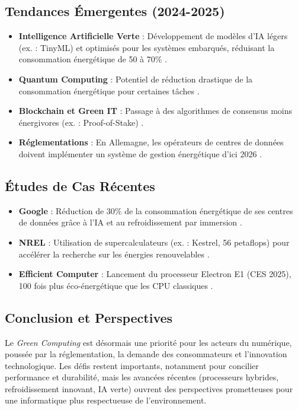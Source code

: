 \documentclass[10pt,a4paper]{article}
\begin{document}
\subsection{Tendances Émergentes (2024-2025)}
\begin{itemize}
    \item \textbf{Intelligence Artificielle Verte} : Développement de modèles d'IA légers (ex. : TinyML) et optimisés pour les systèmes embarqués, réduisant la consommation énergétique de 50 à 70\% \cite{semiengineering2025}.
    \item \textbf{Quantum Computing} : Potentiel de réduction drastique de la consommation énergétique pour certaines tâches \cite{datacenterfrontier2024}.
    \item \textbf{Blockchain et Green IT} : Passage à des algorithmes de consensus moins énergivores (ex. : Proof-of-Stake) \cite{nyabuto2024}.
    \item \textbf{Réglementations} : En Allemagne, les opérateurs de centres de données doivent implémenter un système de gestion énergétique d'ici 2026 \cite{gresb2025}.
\end{itemize}

\subsection{Études de Cas Récentes}
\begin{itemize}
    \item \textbf{Google} : Réduction de 30\% de la consommation énergétique de ses centres de données grâce à l'IA et au refroidissement par immersion \cite{nature2025}.
    \item \textbf{NREL} : Utilisation de supercalculateurs (ex. : Kestrel, 56 petaflops) pour accélérer la recherche sur les énergies renouvelables \cite{nrel2024}.
    \item \textbf{Efficient Computer} : Lancement du processeur Electron E1 (CES 2025), 100 fois plus éco-énergétique que les CPU classiques \cite{efficient2025}.
\end{itemize}

\subsection{Conclusion et Perspectives}
Le \textit{Green Computing} est désormais une priorité pour les acteurs du numérique, poussée par la réglementation, la demande des consommateurs et l'innovation technologique. Les défis restent importants, notamment pour concilier performance et durabilité, mais les avancées récentes (processeurs hybrides, refroidissement innovant, IA verte) ouvrent des perspectives prometteuses pour une informatique plus respectueuse de l'environnement.
\end{document}
